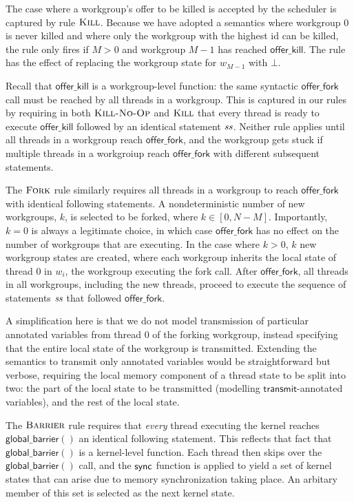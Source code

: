 \documentclass[numbers,nocopyrightspace,10pt]{sigplanconf}
\newcommand{\transmit}{\mathsf{transmit}}
\newcommand{\offerfork}{\mathsf{offer\_fork}}
\newcommand{\offerkill}{\mathsf{offer\_kill}}
\newcommand{\globalbarrier}{\mathsf{global\_barrier}}
\begin{document}
The case where a workgroup's offer to be killed is accepted by the
scheduler is captured by rule $\textsc{Kill}$.  Because we have
adopted a semantics where workgroup 0 is never killed and where only
the workgroup with the highest id can be killed, the rule only fires
if $M > 0$ and workgroup $M-1$ has reached $\offerkill$.  The rule has
the effect of replacing the workgroup state for $w_{M-1}$
with $\bot$.

Recall that $\offerkill$ is a workgroup-level function: the same
syntactic $\offerfork$ call must be reached by all threads in a
workgroup.  This is captured in our rules by requiring in both
$\textsc{Kill-No-Op}$ and $\textsc{Kill}$ that every thread is ready
to execute $\offerkill$ followed by an identical statement $\mathit{ss}$.
Neither rule applies until all threads in a workgroup reach
$\offerfork$, and the workgroup gets stuck if multiple threads in a
workgroiup reach $\offerfork$ with different subsequent statements.

The $\textsc{Fork}$ rule similarly requires all threads in a workgroup
to reach $\offerfork$ with identical following statements.  A
nondeterministic number of new workgroups, $k$, is selected to be
forked, where $k \in [0, N-M]$.  Importantly, $k=0$ is always a
legitimate choice, in which case $\offerfork$ has no effect on the
number of workgroups that are executing.  In the case where $k > 0$,
$k$ new workgroup states are created, where each workgroup inherits
the local state of thread 0 in $w_i$, the workgroup executing the fork
call.  After $\offerfork$, all threads in all workgroups, including
the new threads, proceed to execute the sequence of statements $\mathit{ss}$
that followed $\offerfork$.

A simplification here is that we do not model transmission of
particular annotated variables from thread 0 of the forking workgroup,
instead specifying that the entire local state of the workgroup is
transmitted.  Extending the semantics to transmit only annotated
variables would be straightforward but verbose, requiring the local
memory component of a thread state to be split into two: the part of
the local state to be transmitted (modelling $\transmit$-annotated
variables), and the rest of the local state.

The $\textsc{Barrier}$ rule requires that \emph{every} thread
executing the kernel reaches $\globalbarrier()$ an identical following
statement.  This reflects that fact that $\globalbarrier()$ is a
kernel-level function.  Each thread then skips over the
$\globalbarrier()$ call, and the $\mathsf{sync}$ function is applied to yield
a set of kernel states that can arise due to memory synchronization
taking place.  An arbitary member of this set is selected as the next
kernel state.
\end{document}
